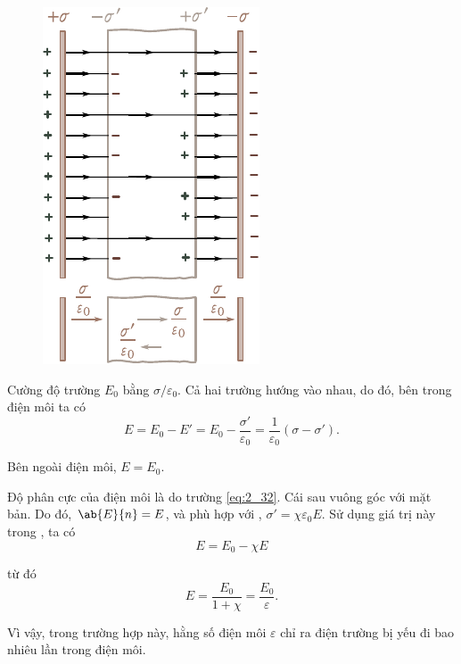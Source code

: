\begin{figure}[!htb]
	\begin{center}
		\includegraphics[scale=1]{figures/ch_02/fig_2_5.pdf}
		\caption[]{}
		\label{fig:2_5}
	\end{center}
	\vspace{-0.8cm}
\end{figure}

Cường độ trường $E_0$ bằng $\sigma/\varepsilon_0$. Cả hai trường hướng vào nhau, do đó, bên trong điện môi ta có
\begin{equation}\label{eq:2_32}
    E = E_0 - E' = E_0 - \frac{\sigma'}{\varepsilon_0} = \frac{1}{\varepsilon_0}(\sigma - \sigma').
\end{equation}

\noindent
Bên ngoài điện môi, $E=E_0$.

Độ phân cực của điện môi là do trường \eqref{eq:2_32}. Cái sau vuông góc với mặt bản. Do đó, $\ab{E}{n}=E$, và phù hợp với , $\sigma'=\chi\varepsilon_0E$. Sử dụng giá trị này trong , ta có
\begin{equation*}
    E = E_0 - \chi E
\end{equation*}

\noindent
từ đó
\begin{equation}\label{eq:2_33}
    E = \frac{E_0}{1 + \chi} = \frac{E_0}{\varepsilon}.
\end{equation}

\noindent
Vì vậy, trong trường hợp này, hằng số điện môi $\varepsilon$
chỉ ra điện trường bị yếu đi bao nhiêu lần trong điện môi.

